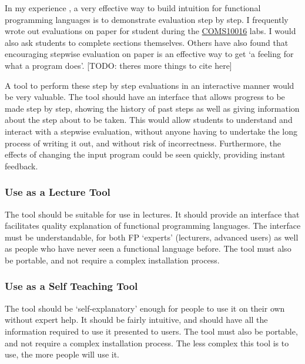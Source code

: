 In my experience , a very effective way to build intuition for functional programming languages is to demonstrate evaluation step by step. I frequently wrote out evaluations on paper for student during the \hyperref[COMS10016]{COMS10016} labs. I would also ask students to complete sections themselves. Others have also found that encouraging stepwise evaluation on paper is an effective way to get `a feeling for what a program does'. \cite{fp_first_year} [TODO: theres more things to cite here]

 A tool to perform these step by step evaluations in an interactive manner would be very valuable. The tool should have an interface that allows progress to be made step by step, showing the history of past steps as well as giving information about the step about to be taken. This would allow students to understand and interact with a stepwise evaluation, without anyone having to undertake the long process of writing it out, and without risk of incorrectness. Furthermore, the effects of changing the input program could be seen quickly, providing instant feedback. 

\subsubsection{Use as a Lecture Tool} The tool should be suitable for use in lectures. It should provide an interface that facilitates quality explanation of functional programming languages. The interface must be understandable, for both \ac{FP}  `experts' (lecturers, advanced users) as well as people who have never seen a functional language before. The tool must also be portable, and not require a complex installation process. 

\subsubsection{Use as a Self Teaching Tool} The tool should be `self-explanatory' enough for people to use it on their own without expert help. It should be fairly intuitive, and should have all the information required to use it presented to users. The tool must also be portable, and not require a complex installation process. The less complex this tool is to use, the more people will use it. 

